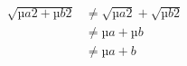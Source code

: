 \begin{align}
\sqrt{µ{a2}+µ{b2}} & \neq \sqrt{µ{a2}} + \sqrt{µ{b2}} \\
& \neq µ{a} + µ{b} \\
& \neq µ{a+b}
\end{align}